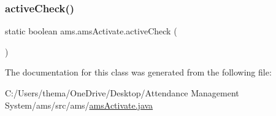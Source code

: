 \mbox{\label{classams_1_1ams_activate_a0d114e5980e360dddeb2c9243cdc3b52}} 
\subsubsection{\texorpdfstring{activeCheck()}{activeCheck()}}
{\footnotesize\ttfamily static boolean ams.\+ams\+Activate.\+active\+Check (\begin{DoxyParamCaption}{ }\end{DoxyParamCaption})\hspace{0.3cm}{\ttfamily [static]}}



The documentation for this class was generated from the following file\+:\begin{DoxyCompactItemize}
\item 
C\+:/\+Users/thema/\+One\+Drive/\+Desktop/\+Attendance Management System/ams/src/ams/\mbox{\hyperlink{ams_activate_8java}{ams\+Activate.\+java}}\end{DoxyCompactItemize}
